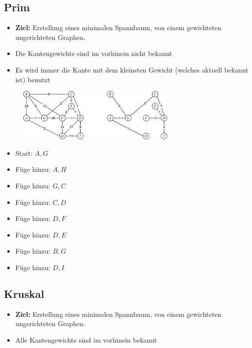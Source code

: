 \subsection{Prim}

\begin{itemize}
\item \textbf{Ziel:} Erstellung eines minimalen Spannbaum, von einem gewichteten ungerichteten Graphen.
\item Die Kantengewichte sind im vorhinein nicht bekannt
\item Es wird immer die Kante mit dem kleinsten Gewicht (welches aktuell bekannt ist) benutzt
\end{itemize}

\begin{figure}[h]
\centering
\includegraphics[width=0.7\textwidth]{graphics/prim_kruskal.png}
\end{figure}

\begin{itemize}
\item Start: ${A,G}$
\item Füge hinzu: ${A,H}$
\item Füge hinzu: ${G,C}$
\item Füge hinzu: ${C,D}$
\item Füge hinzu: ${D,F}$
\item Füge hinzu: ${D,E}$
\item Füge hinzu: ${B,G}$
\item Füge hinzu: ${D,I}$
\end{itemize}

\newpage

\subsection{Kruskal}

\begin{itemize}
\item \textbf{Ziel:} Erstellung eines minimalen Spannbaum, von einem gewichteten ungerichteten Graphen.
\item Alle Kantengewichte sind im vorhinein bekannt
\end{itemize}


